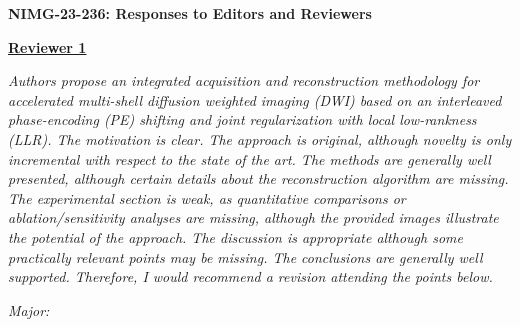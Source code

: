 \documentclass[a4paper,11pt,twoside]{report}
\begin{document}
\begin{center}
	{\large\textbf{NIMG-23-236: Responses to Editors and Reviewers}}
\end{center}





\noindent \underline{\textbf{Reviewer 1}}

\textit{Authors propose an integrated acquisition and reconstruction methodology for accelerated multi-shell diffusion weighted imaging (DWI) based on an interleaved phase-encoding (PE) shifting and joint regularization with local low-rankness (LLR). The motivation is clear. The approach is original, although novelty is only incremental with respect to the state of the art. The methods are generally well presented, although certain details about the reconstruction algorithm are missing. The experimental section is weak, as quantitative comparisons or ablation/sensitivity analyses are missing, although the provided images illustrate the potential of the approach. The discussion is appropriate although some practically relevant points may be missing. The conclusions are generally well supported. Therefore, I would recommend a revision attending the points below.}

\vspace{1em}

\noindent \textit{Major:}
\end{document}
